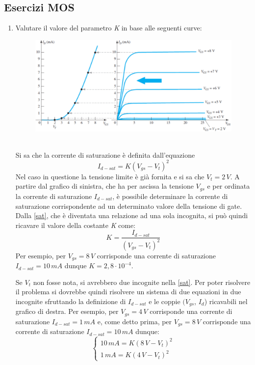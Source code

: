 \documentclass[12pt, a4paper]{report}
\begin{document}
\begin{appendices}
\chapter{Esercizi MOS}
\begin{enumerate}
    \item Valutare il valore del parametro \textit{K} in base alle seguenti curve:
    \begin{figure}[h]
        \centering
       \includegraphics[scale=0.4,angle=0]{n_mos_es1.png}
    \end{figure}
    \\Si sa che la corrente di saturazione è definita dall'equazione
    \begin{equation}
        I_{d-sat} = K(V_{gs} - V_{t})^2
        \label{sat}
    \end{equation}
    Nel caso in questione la tensione limite è già fornita e si sa che $V_{t} = 2\,V$. A partire dal grafico di sinistra, che ha per ascissa la tensione $V_{gs}$ e per ordinata la corrente di saturazione $I_{d-sat}$, è possibile determinare la corrente di saturazione corrispondente ad un determinato valore della tensione di gate. Dalla \eqref{sat}, che è diventata una relazione ad una sola incognita, si può quindi ricavare il valore della costante \textit{K} come:
    \begin{equation*}
        K = \frac{I_{d-sat}}{(V_{gs} - V_{t})^2}
    \end{equation*}
    Per esempio, per $V_{gs} = 8\,V$ corrisponde una corrente di saturazione $I_{d-sat} = 10\,mA$ dunque $K = 2,8 \cdot 10^{-4}$.
    
    Se $V_{t}$ non fosse nota, si avrebbero due incognite nella \eqref{sat}. Per poter risolvere il problema si dovrebbe quindi risolvere un sistema di due equazioni in due incognite sfruttando la definizione di $I_{d-sat}$ e le coppie $(V_{gs}$, $I_{d}$) ricavabili nel grafico di destra. Per esempio, per $V_{gs} = 4\,V$ corrisponde una corrente di saturazione $I_{d-sat} = 1\,mA$ e, come detto prima, per $V_{gs} = 8\,V$ corrisponde una corrente di saturazione $I_{d-sat} = 10\,mA$ dunque:
    \begin{equation*}
    \left\{
    \begin{array}{l}
    10\,mA = K(8\,V - V_{t})^2\\
    1\,mA = K(4\,V - V_{t})^2
\end{array}\right.
\end{equation*}

\end{enumerate}
\end{appendices}
\end{document}
